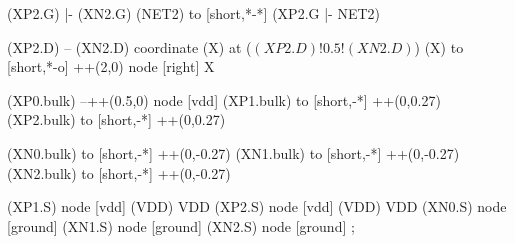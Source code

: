 \begin{circuitikz}[american]
	(XP2.G) |- (XN2.G)
	(NET2) to [short,*-*] (XP2.G |- NET2) 
	
	(XP2.D) -- (XN2.D)
	coordinate (X) at ($(XP2.D)!0.5!(XN2.D)$)
	(X) to [short,*-o] ++(2,0) node [right] {X}
	
	(XP0.bulk) --++(0.5,0) node [vdd]{}
	(XP1.bulk) to [short,-*] ++(0,0.27)
	(XP2.bulk) to [short,-*] ++(0,0.27)
	
	(XN0.bulk) to [short,-*] ++(0,-0.27)
	(XN1.bulk) to [short,-*] ++(0,-0.27)
	(XN2.bulk) to [short,-*] ++(0,-0.27)


	(XP1.S) node [vdd] (VDD) {VDD}
	(XP2.S) node [vdd] (VDD) {VDD}
	(XN0.S) node [ground] {}
	(XN1.S) node [ground] {}
	(XN2.S) node [ground] {}
;

\end{circuitikz}
